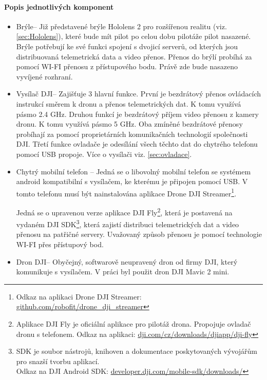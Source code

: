 \paragraph{Popis jednotlivých komponent}
\begin{itemize}
    \item Brýle-- Již představené brýle Hololens 2 pro rozšířenou realitu (viz. \ref{sec:Hololens}), které bude mít pilot po celou dobu pilotáže pilot nasazené. Brýle potřebují ke své funkci spojení s dvojicí serverů, od kterých jsou distribuovaná telemetrická data a video přenos. Přenos do brýlí probíhá za pomocí WI-FI přenosu z přístupového bodu. Právě zde bude nasazeno vyvíjené rozhraní. 
   
    \item Vysílač  DJI\texttrademark-- Zajišťuje 3 hlavní funkce. První je bezdrátový přenos ovládacích instrukcí směrem k dronu a přenos telemetrických dat. K tomu využívá pásmo 2.4 GHz. Druhou funkcí je bezdrátový příjem video přenosu z kamery dronu. K tomu využívá pásmo 5 GHz. Oba zmíněné bezdrátové přenosy probíhají za pomocí proprietárních komunikačních technologií společnosti DJI\texttrademark. Třetí funkce ovladače je odesílání všech těchto dat do chytrého telefonu pomocí USB propoje. Více o vysílači viz. \ref{sec:ovladace}.
    
    \item Chytrý mobilní telefon -- Jedná se o libovolný mobilní telefon se systémem android kompatibilní s vysílačem, ke kterému je připojen pomocí USB. V tomto telefonu musí být nainstalována  aplikace Drone DJI Streamer\footnote{Odkaz na aplikaci Drone DJI Streamer: \href{https://github.com/robofit/drone\_dji\_streamer}{github.com/robofit/drone\_dji\_streamer}}. 

    
    Jedná se o upravenou verze aplikace DJI Fly\footnote{Aplikace DJI Fly je oficiální aplikace pro pilotáž drona. Propojuje ovladač dronu s telefonem. Odkaz na aplikaci: \href{https://www.dji.com/cz/downloads/djiapp/dji-fly}{dji.com/cz/downloads/djiapp/dji-fly}  }, která je postavená na vydaném DJI SDK\footnote{SDK je soubor nástrojů, knihoven a dokumentace poskytovaných vývojářům pro snazší tvorbu aplikací. \\ Odkaz na DJI Android SDK: \href{https://developer.dji.com/mobile-sdk/downloads/}{developer.dji.com/mobile-sdk/downloads/}},  která zajistí distribuci telemetrických dat a video přenosu na patřičné servery. Uvažovaný způsob přenosu je pomocí technologie WI-FI přes přístupový bod. 
   
    \item Dron DJI\texttrademark \space -- Obyčejný, softwarově neupravený dron od firmy DJI\texttrademark, který komunikuje s vysílačem. V práci byl použit dron DJI Mavic 2 mini.
   

\end{itemize}
